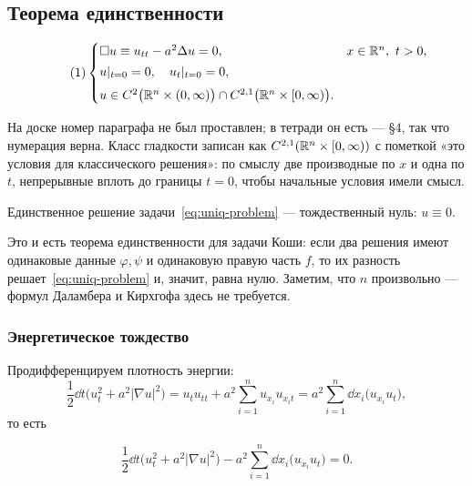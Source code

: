 \subsection{Теорема единственности}

\begin{equation}\tag{1}\label{eq:uniq-problem}
  \begin{cases}
    \Box u \equiv u_{tt} - a^2 \Delta u = 0, & x \in \mathbb{R}^n,\ t > 0, \\[2pt]
    u|_{t=0} = 0, \quad u_t|_{t=0} = 0, \\[4pt]
    u \in C^2\big(\mathbb{R}^n \times (0,\infty)\big) \cap
         C^{2,1}\big(\mathbb{R}^n \times [0,\infty)\big) .
  \end{cases}
\end{equation}

\begin{warn}
На доске номер параграфа не был проставлен; в тетради он есть — \S4, так что
нумерация верна. Класс гладкости записан как
$C^{2,1}(\mathbb{R}^n \times [0,\infty))$ с пометкой «это условия для классического
решения»: по смыслу две производные по $x$ и одна по $t$, непрерывные вплоть
до границы $t=0$, чтобы начальные условия имели смысл.
\end{warn}

\begin{theorem}[единственность]
Единственное решение задачи~\eqref{eq:uniq-problem} — тождественный нуль:
$u \equiv 0$.
\end{theorem}

\begin{idea}
Это и есть теорема единственности для задачи Коши: если два решения имеют
одинаковые данные $\varphi, \psi$ и одинаковую правую часть $f$, то их разность
решает~\eqref{eq:uniq-problem} и, значит, равна нулю. Заметим, что $n$
произвольно — формул Даламбера и Кирхгофа здесь не требуется.
\end{idea}

\subsubsection*{Энергетическое тождество}

Продифференцируем плотность энергии:
\[
  \frac12 \dd{}{t}\Big(u_t^2 + a^2 |\nabla u|^2\Big)
  = u_t u_{tt} + a^2 \sum_{i=1}^{n} u_{x_i} u_{x_i t}
  = a^2 \sum_{i=1}^{n} \dd{}{x_i}\big(u_{x_i} u_t\big) ,
\]
то есть

\begin{equation}\tag{2}\label{eq:energy-identity}
  \frac12 \dd{}{t}\Big(u_t^2 + a^2 |\nabla u|^2\Big)
  - a^2 \sum_{i=1}^{n} \dd{}{x_i}\big(u_{x_i} u_t\big) = 0 .
\end{equation}

